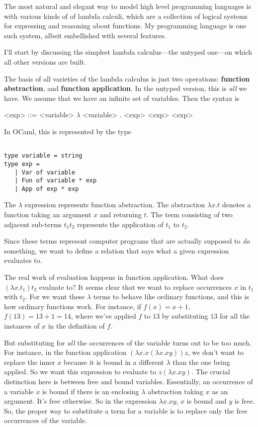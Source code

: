 \documentclass[pageno]{jpaper}
\begin{document}
{The most natural and elegant way to model high level programming languages is
with various kinds of of lambda calculi, which are a collection of logical systems
for expressing and reasoning about functions.  My programming language is one
such system, albeit embellished with several features.

I'll start by discussing the simplest lambda calculus---the untyped one---on
which all other versions are built.

The basis of all varieties of the lambda calculus is just two operations: \textbf{function abstraction},
and \textbf{function application}.
In the untyped version, this is \textit{all} we have.
We assume that we have an infinite set of variables.
Then the syntax is
\begin{grammar}

<exp> ::= <variable>
\alt $\lambda$ <variable> . <exp>
\alt <exp> <exp>

\end{grammar}

In OCaml, this is represented by the type
\begin{lstlisting}

type variable = string
type exp = 
   | Var of variable
   | Fun of variable * exp
   | App of exp * exp

\end{lstlisting}

The $\lambda$ expression represents function abstraction. The abstraction $\lambda x.t$ denotes
a function taking an argument $x$ and returning $t$. The term consisting of two adjacent sub-terms $t_1 t_2$ represents the application of $t_1$ to $t_2$.

Since these terms represent computer programs that are actually supposed to \textit{do} something, we want to
define a relation that says what a given expression evaluates to.

The real work of evaluation happens in function application. What does $(\lambda x.t_1)t_2$ evaluate to?
It seems clear that we want to replace occurrences $x$ in $t_1$ with $t_2$.
For we want these $\lambda$ terms to behave like ordinary functions, and this is how ordinary functions work.
For instance, if $f(x) = x + 1$, $f(13) = 13 + 1 = 14$, where we've applied $f$ to $13$ by substituting
$13$ for all the instances of $x$ in the definition of $f$.

But substituting for \textit{all} the occurrences of the variable turns out to be too much.
For instance, in the function application $(\lambda x. x (\lambda x. x y)) z$, we don't want to replace the inner
$x$ because it is bound in a different $\lambda$ than the one being applied.
So we want this expression to evaluate to $z (\lambda x. x y)$. The crucial distinction here is between
free and bound variables. Essentially, an occurrence of a variable $x$ is bound if there is an enclosing $\lambda$ abstraction taking $x$ as an argument.  It's free otherwise. So in the expression $\lambda x. x y$,
$x$ is bound and $y$ is free.  So, the proper way to substitute a term for a variable is to replace only
the free occurrences of the variable. 

}
\end{document}
